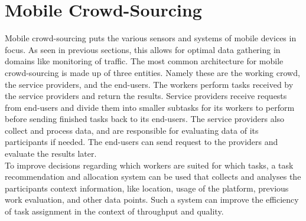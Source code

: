 \documentclass[a4paper,12pt]{report}
\begin{document}
	\section[Mobile Crowd-Sourcing]{Mobile Crowd-Sourcing \cite{MobileCrowdSourcing}}
	\startsection
		Mobile crowd-sourcing puts the various sensors and systems of mobile devices in focus. 
		As seen in previous sections, this allows for optimal data gathering in domains like monitoring of traffic.
		The most common architecture for mobile crowd-sourcing is made up of three entities. 
		Namely these are the working crowd, the service providers, and the end-users. 
		The workers perform tasks received by the service providers and return the results. 
		Service providers receive requests from end-users and divide them into smaller subtasks for its workers to perform before sending finished tasks back to its end-users. 
		The service providers also collect and process data, and are responsible for evaluating data of its participants if needed. 
		The end-users can send request to the providers and evaluate the results later.\\
		To improve decisions regarding which workers are suited for which tasks, a task recommendation and allocation system can be used that collects and analyses the participants context information, like location, usage of the platform, previous work evaluation, and other data points. 
		Such a system can improve the efficiency of task assignment in the context of throughput and quality.
		
\end{document}
